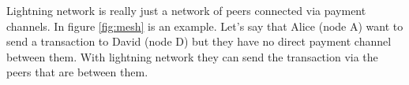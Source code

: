 Lightning network is really just a network of peers connected via payment channels. In figure \ref{fig:mesh} is an example. Let's say that Alice (node A) want to send a transaction to David (node D) but they have no direct payment channel between them. With lightning network they can send the transaction via the peers that are between them. 